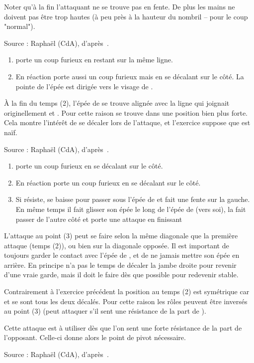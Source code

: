 Noter qu'à la fin l'attaquant ne se trouve pas en fente.
De plus les mains ne doivent pas être trop hautes (à peu près à la hauteur du nombril – pour le coup "normal").

Source : Raphaël (CdA), d'après~\cite{farrell:ringeck}.
\begin{exercice}

\begin{enumerate}
	\item \A porte un coup furieux en restant sur la même ligne.
	
	\item En réaction \D porte aussi un coup furieux mais en se décalant sur le côté.
	La pointe de l'épée est dirigée vers le visage de \A.
\end{enumerate}

À la fin du temps (2), l'épée de \D se trouve alignée avec la ligne qui joignait originellement \A et \D.
Pour cette raison \D se trouve dans une position bien plus forte.
Cela montre l'intérêt de se décaler lors de l'attaque, et l'exercice suppose que \A est naïf.

Source : Raphaël (CdA), d'après~\cite{farrell:ringeck}.
\end{exercice}

\begin{exercice}

\begin{enumerate}
	\item \A porte un coup furieux en se décalant sur le côté.
	
	\item En réaction \D porte un coup furieux en se décalant sur le côté.
	
	\item Si \A résiste, \D se baisse pour passer sous l'épée de \A et fait une fente sur la gauche.
	En même temps il fait glisser son épée le long de l'épée de \A (vers soi), la fait passer de l'autre côté et porte une attaque en finissant 
\end{enumerate}

L'attaque au point (3) peut se faire selon la même diagonale que la première attaque (temps (2)), ou bien sur la diagonale opposée.
Il est important de toujours garder le contact avec l'épée de \A, et de ne jamais mettre son épée en arrière.
En principe \D n'a pas le temps de décaler la jambe droite pour revenir d'une vraie garde, mais il doit le faire dès que possible pour redevenir stable.

Contrairement à l'exercice précédent la position au temps (2) est symétrique car \A et \D se sont tous les deux décalés.
Pour cette raison les rôles peuvent être inversés au point (3) (\A peut attaquer s'il sent une résistance de la part de \D).

Cette attaque est à utiliser dès que l'on sent une forte résistance de la part de l'opposant.
Celle-ci donne alors le point de pivot nécessaire.

Source : Raphaël (CdA), d'après~\cite{farrell:ringeck}.
\end{exercice}


